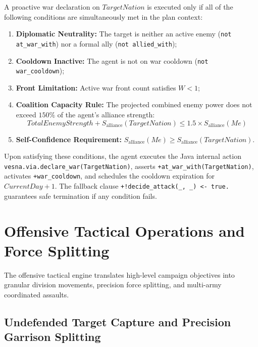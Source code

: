 A proactive war declaration on $\mathit{TargetNation}$ is executed only if all of the following conditions are simultaneously met in the plan context:
\begin{enumerate}[label=\alph*)]
    \item \textbf{Diplomatic Neutrality:} The target is neither an active enemy (\texttt{not at\_war\_with}) nor a formal ally (\texttt{not allied\_with});
    \item \textbf{Cooldown Inactive:} The agent is not on war cooldown (\texttt{not war\_cooldown});
    \item \textbf{Front Limitation:} Active war front count satisfies $W < 1$;
    \item \textbf{Coalition Capacity Rule:} The projected combined enemy power does not exceed $150\%$ of the agent's alliance strength:
    \begin{equation}
        \label{eq:coalition_capacity}
        \mathit{TotalEnemyStrength} + S_{\text{alliance}}(\mathit{TargetNation}) \le 1.5 \times S_{\text{alliance}}(Me)
    \end{equation}
    \item \textbf{Self-Confidence Requirement:} $S_{\text{alliance}}(Me) \ge S_{\text{alliance}}(\mathit{TargetNation})$.
\end{enumerate}

Upon satisfying these conditions, the agent executes the Java internal action \texttt{vesna.via.declare\_war(TargetNation)}, asserts \texttt{+at\_war\_with(TargetNation)}, activates \texttt{+war\_cooldown}, and schedules the cooldown expiration for $\mathit{CurrentDay} + 1$. The fallback clause \texttt{+!decide\_attack(\_, \_) <- true.} guarantees safe termination if any condition fails.

\section{Offensive Tactical Operations and Force Splitting}
\label{sec:impl_offensive_tactics}

The offensive tactical engine translates high-level campaign objectives into granular division movements, precision force splitting, and multi-army coordinated assaults.

\subsection{Undefended Target Capture and Precision Garrison Splitting}
\label{subsec:undefended_tactics}

